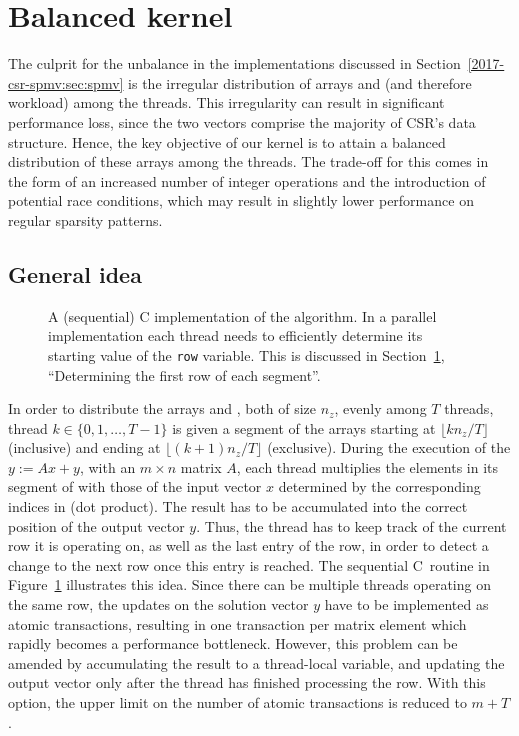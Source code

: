 \section{Balanced \spmv kernel}
\label{2017-csr-spmv:sec:kernel}

The culprit for the unbalance in the \spmv implementations
discussed in Section~\ref{2017-csr-spmv:sec:spmv}
is the irregular distribution of arrays \val and \colidx
(and therefore workload) among the threads.
This irregularity can result in significant performance loss,
since the two vectors comprise the majority of CSR's data structure.
Hence, the key objective of our kernel is to attain a balanced distribution of
these arrays among the threads.
The trade-off for this comes in the form of an increased number
of integer operations and the introduction of potential race conditions,
which may result in slightly lower performance on regular sparsity patterns.

\subsection{General idea}

\begin{figure}[t]

\caption[A (sequential) C implementation of the \bcsr algorithm]
    {A (sequential) C implementation of the \bcsr algorithm.
        In a parallel implementation each thread needs to
        efficiently determine its starting value of the \texttt{row} variable.
    This is discussed in Section~\ref{2017-csr-spmv:sec:kernel}, ``Determining
the first row of each segment''.}
\label{2017-csr-spmv:fig:spmvi}
\end{figure}

In order to distribute the arrays \val and \colidx, both of size $n_z$,
evenly among $T$ threads,
thread \linebreak $k \in \lbrace 0,1, \ldots, T-1 \rbrace$ is given
a segment of the arrays starting at $\lfloor kn_z / T\rfloor$ (inclusive)
and ending at $\lfloor (k+1)n_z/T\rfloor$ (exclusive).
During the execution of the \spmv $y:=Ax + y$, with an $m \times n$ matrix $A$,
each thread multiplies 
the elements in its segment of \val with those of the input vector $x$
determined by the corresponding indices in \colidx (dot product).
The result has to be accumulated into the correct position
of the output vector $y$.
Thus, the thread has to keep track of the current row it is operating on,
as well as the last entry of the row,
in order to detect a change to the next row once this entry is reached.
The sequential C~routine in Figure~\ref{2017-csr-spmv:fig:spmvi} illustrates this idea.
Since there can be multiple threads operating on the same row,
the updates on the solution vector $y$ have to be implemented
as atomic transactions,
resulting in one transaction per matrix element
which rapidly becomes a performance bottleneck.
However, this problem can be amended
by accumulating the result to a thread-local variable,
and updating the output vector only
after the thread has finished processing the row.
With this option, the upper limit on the number of atomic transactions
is reduced to $m + T$.

